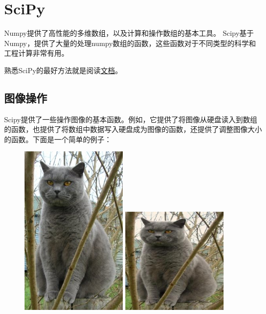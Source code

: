 \section{SciPy}


Numpy提供了高性能的多维数组，以及计算和操作数组的基本工具。 Scipy基于 Numpy，提供了大量的处理numpy数组的函数，这些函数对于不同类型的科学和工程计算非常有用。

熟悉SciPy的最好方法就是阅读\href{http://docs.scipy.org/doc/scipy/reference/index.html}{文档}。


\subsection{图像操作}

Scipy提供了一些操作图像的基本函数。例如，它提供了将图像从硬盘读入到数组的函数，也提供了将数组中数据写入硬盘成为图像的函数，还提供了调整图像大小的函数。下面是一个简单的例子：



\begin{figure}[htbp]
\centering
\includegraphics[width=2in]{images/cat.jpg}
\includegraphics[width=2in]{images/cat_tinted.jpg}
\end{figure}

